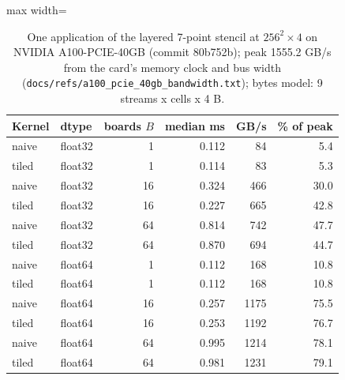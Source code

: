\begin{table}[t]\centering\small
\begin{adjustbox}{max width=\linewidth}\begin{tabular}{llrrrr}
\hline
Kernel & dtype & boards $B$ & median ms & GB/s & \% of peak \\
\hline
naive & float32 & 1 & 0.112 & 84 & 5.4 \\
tiled & float32 & 1 & 0.114 & 83 & 5.3 \\
naive & float32 & 16 & 0.324 & 466 & 30.0 \\
tiled & float32 & 16 & 0.227 & 665 & 42.8 \\
naive & float32 & 64 & 0.814 & 742 & 47.7 \\
tiled & float32 & 64 & 0.870 & 694 & 44.7 \\
naive & float64 & 1 & 0.112 & 168 & 10.8 \\
tiled & float64 & 1 & 0.112 & 168 & 10.8 \\
naive & float64 & 16 & 0.257 & 1175 & 75.5 \\
tiled & float64 & 16 & 0.253 & 1192 & 76.7 \\
naive & float64 & 64 & 0.995 & 1214 & 78.1 \\
tiled & float64 & 64 & 0.981 & 1231 & 79.1 \\
\hline
\end{tabular}\end{adjustbox}
\caption{One application of the layered 7-point stencil at $256^2\times4$ on NVIDIA A100-PCIE-40GB (commit 80b752b); peak 1555.2 GB/s from the card's memory clock and bus width (\texttt{docs/refs/a100\_pcie\_40gb\_bandwidth.txt}); bytes model: 9 streams x cells x 4 B.}
\label{tab:bw}
\end{table}
